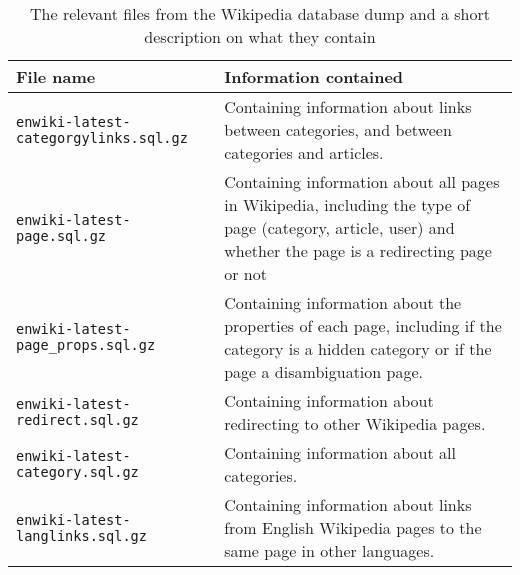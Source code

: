 



\begin{table}[ht]
\renewcommand{\arraystretch}{1.25}
\begin{tabularx}{\textwidth}{l|X}
\textbf{File name} & \textbf{Information contained}\\ \hline
\texttt{enwiki-latest-categorgylinks.sql.gz} &  Containing information about links between categories, and between categories and articles. \\ \hline
\texttt{enwiki-latest-page.sql.gz} & Containing information about all pages in Wikipedia, including the type of page (category, article, user) and whether the page is a redirecting page or not\\ \hline
\texttt{enwiki-latest-page\_props.sql.gz} & Containing information about the properties of each page, including if the category is a hidden category or if the page a disambiguation page. \\ \hline
\texttt{enwiki-latest-redirect.sql.gz} & Containing information about redirecting to other Wikipedia pages. \\ \hline
\texttt{enwiki-latest-category.sql.gz} & Containing information about all categories. \\ \hline
\texttt{enwiki-latest-langlinks.sql.gz} & Containing information about links from English Wikipedia pages to the same page in other languages.
\end{tabularx}
\\[10pt]
\caption[Relevant files from Wikipedia database dump]{The relevant files from the Wikipedia database dump and a short description on what they contain}
\label{tab:databasedumpfiles}
\end{table}
